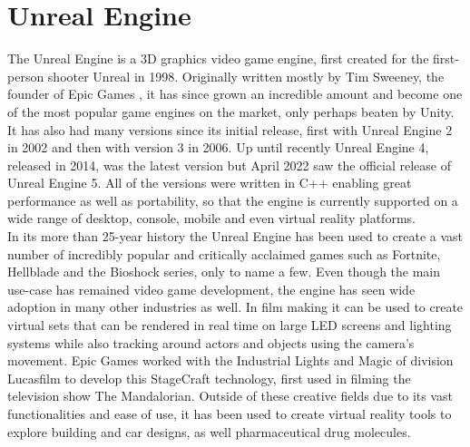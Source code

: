\chapter{Unreal Engine}\label{chp:UnrealEngine}

The Unreal Engine is a 3D graphics video game engine, first created for the first-person shooter Unreal in 1998\cite{bib:UnrealFacts}. Originally written mostly by Tim Sweeney, the founder of Epic Games \cite{bib:TimSweeney}, it has since grown an incredible amount and become one of the most popular game engines on the market, only perhaps beaten by Unity\cite{bib:UnrealFacts}. It has also had many versions since its initial release, first with Unreal Engine 2 in 2002 and then with version 3 in 2006\cite{bib:UnrealFacts}. Up until recently Unreal Engine 4, released in 2014, was the latest version but April 2022 saw the official release of Unreal Engine 5. All of the versions were written in C++ enabling great performance as well as portability, so that the engine is currently supported on a wide range of desktop, console, mobile and even virtual reality platforms\cite{bib:UnrealFacts}.\\

In its more than 25-year history the Unreal Engine has been used to create a vast number of incredibly popular and critically acclaimed games such as Fortnite, Hellblade and the Bioshock series, only to name a few\cite{bib:UnrealGames}. Even though the main use-case has remained video game development, the engine has seen wide adoption in many other industries as well. In film making it can be used to create virtual sets that can be rendered in real time on large LED screens and lighting systems while also tracking around actors and objects using the camera's movement. Epic Games worked with the Industrial Lights and Magic of division Lucasfilm to develop this StageCraft technology, first used in filming the television show The Mandalorian\cite{bib:Mando}. Outside of these creative fields due to its vast functionalities and ease of use, it has been used to create virtual reality tools to explore building and car designs, as well pharmaceutical drug molecules\cite{bib:VRFields}.\\

